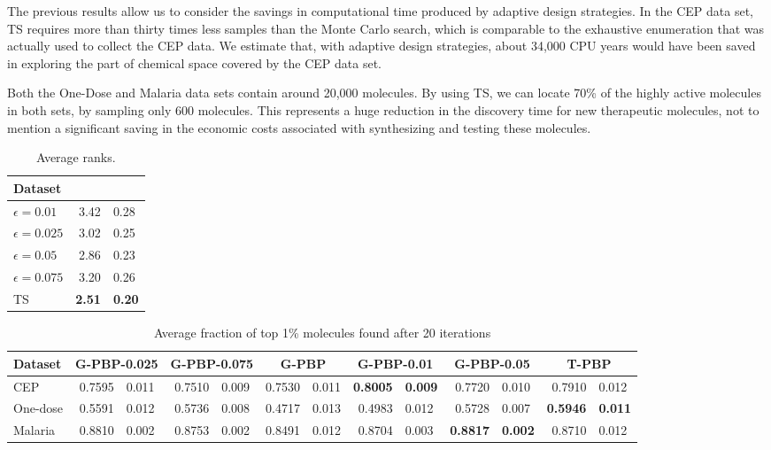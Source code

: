 The previous results allow us to consider the savings in computational time produced by adaptive design strategies. In the CEP data set, TS requires more than thirty times less samples than the Monte Carlo search, which is comparable to the exhaustive enumeration that was actually used to collect the CEP data. We estimate that, with adaptive design strategies, about 34,000 CPU years would have been saved in exploring the part of chemical space covered by the CEP data set. 

Both the One-Dose and Malaria data sets contain around 20,000 molecules. By using TS, we can locate 70\% of the highly active molecules in both sets, by sampling only 600 molecules. This represents a huge reduction in the discovery time for new therapeutic molecules, not to mention a significant saving in the economic costs associated with synthesizing and testing these molecules.

\begin{table}
\centering
\caption{Average ranks.}\label{tab:results_epsilon_greedy}
\begin{tabular}{lr@{$\pm$}l}
\hline
\bf{Dataset}& \\%
\hline
$\epsilon = 0.01$ & 3.42 & 0.28 \\
$\epsilon = 0.025$ & 3.02 & 0.25 \\
$\epsilon = 0.05$ & 2.86 & 0.23 \\
$\epsilon = 0.075$ & 3.20 & 0.26 \\
TS & \bf{ 2.51 }&\bf{ 0.20 }
\hline
\end{tabular}
\end{table}

\begin{table}
\centering
\caption{ Average fraction of top 1\% molecules found after 20 iterations }
\label{tab:results}
\begin{tabular}{lr@{$\pm$}lr@{$\pm$}lr@{$\pm$}lr@{$\pm$}lr@{$\pm$}lr@{$\pm$}l}\hline
\bf{Dataset}&\multicolumn{2}{c}{\bf{ G-PBP-0.025 }}&\multicolumn{2}{c}{\bf{ G-PBP-0.075 }}&\multicolumn{2}{c}{\bf{ G-PBP }}&\multicolumn{2}{c}{\bf{ G-PBP-0.01 }}&\multicolumn{2}{c}{\bf{ G-PBP-0.05 }}&\multicolumn{2}{c}{\bf{ T-PBP }}\\
\hline
CEP&0.7595&0.011&0.7510&0.009&0.7530&0.011&\bf{0.8005}&\bf{0.009}&0.7720&0.010&0.7910&0.012\\
One-dose&0.5591&0.012&0.5736&0.008&0.4717&0.013&0.4983&0.012&0.5728&0.007&\bf{0.5946}&\bf{0.011}\\
Malaria&0.8810&0.002&0.8753&0.002&0.8491&0.012&0.8704&0.003&\bf{0.8817}&\bf{0.002}&0.8710&0.012\\
\hline
\end{tabular}
\end{table}

